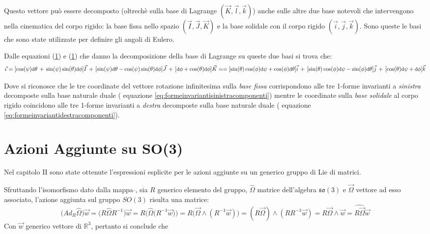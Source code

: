 \documentclass[11pt]{report}
\theoremstyle{plain}
\theoremstyle{definition}
\theoremstyle{remark}
\begin{document}
Questo vettore può essere decomposto (oltrechè sulla base di Lagrange $(\vec{K} , \vec{l} , \vec{k})$) anche sulle altre due base notevoli che intervengono nella cinematica del corpo rigido: la base fissa nello spazio $(\vec{I}, \vec{J}, \vec{K}) $ e la base solidale con il corpo rigido $(\vec{i}, \vec{j}, \vec{k}) $.
Sono queste le basi che sono state utilizzate per definire gli angoli di Eulero.

Dalle equazioni (\ref{}) e (\ref{}) che danno la decomposizione della base di Lagrange su queste due basi si trova che:
\begin{equation}\small
\vec{\epsilon}= [\cos(\psi)\textrm{d}\theta \, + \, \sin(\psi)\sin(\theta)\textrm{d}\phi] \vec{I} \, + \, [\sin(\psi)\textrm{d}\theta - \cos(\psi) \sin(\theta)\textrm{d}\phi] \vec{J} \, + \, [\textrm{d}\phi + \cos(\theta)\textrm{d}\phi]\vec{K} =
=[\sin(\theta)\cos(\phi)\textrm{d}\psi + \cos(\phi)\textrm{d}\theta] \vec{i}\, + \, [\sin(\theta)\cos(\phi)\textrm{d}\psi - \sin(\phi)\textrm{d}\theta]\vec{j} \, + \, [\cos(\theta)\textrm{d}\psi + \textrm{d}\phi]\vec{k}
\end{equation}


Dove si riconosce che le tre coordinate del vettore rotazione infinitesima sulla \emph{base fissa} corrispondono alle tre 1-forme invarianti a \emph{sinistra} decomposte sulla base naturale duale ( equazione \ref{eq:formeinvariantisinistracomponenti}) mentre le coordinate sulla \emph{base solidale} al corpo rigido coincidono alle tre 1-forme invarianti a \emph{destra} decomposte sulla base naturale duale ( equazione \ref{eq:formeinvariantidestracomponenti}).






\section{Azioni Aggiunte su SO(3)}
Nel capitolo II sono state ottenute l'espressioni esplicite per le azioni aggiunte su un generico gruppo di Lie di matrici.

Sfruttando l'isomorfismo dato dalla mappa $\widehat{}$, sia $R$ generico elemento del gruppo, $\widehat{\Omega}$ matrice dell'algebra $\mathfrak{so(3)}$ e $\vec{\Omega}$ vettore ad esso associato, l'azione aggiunta sul gruppo $SO(3)$ risulta una matrice:
\begin{displaymath}
\bigr( Ad_{R}\widehat{\Omega}\bigr) \vec{w} = \bigr( R \widehat{\Omega} R^{-1}\bigr) \vec{w} = R \Bigr(\widehat{\Omega}  \bigr(R^{-1}\vec{w}\bigr) \Bigr) = R \Bigr(\vec{\Omega} \wedge (R^{-1}\vec{w}) \Bigr) = ( R \vec{\Omega}) \wedge (R R^{-1} \vec{w} ) = R \vec{\Omega} \wedge \vec{w} = \widehat{R \vec{\Omega}} \vec{w}  
\end{displaymath}
Con $\vec{w}$ generico vettore di $\mathbb{R}^{3}$, pertanto si conclude che
\end{document}
